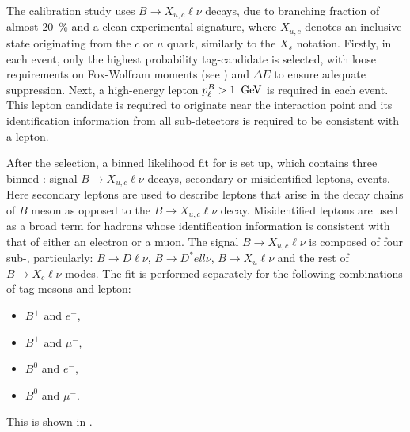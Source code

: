 The calibration study uses $B\rightarrow X_{u,c} \ell \nu$ decays, due to branching fraction of almost 20~\% and a clean experimental signature, 
where $X_{u,c}$ denotes an inclusive state originating from the $c$ or $u$ quark, similarly to the $X_s$ notation.
Firstly, in each event, only the highest \FEI probability tag-\B candidate is selected, with loose requirements on Fox-Wolfram moments (see ) and $\Delta E$ to ensure adequate \epem\ra\qqbar suppression.
Next, a high-energy lepton $p_{\ell}^B>1~\mathrm{\,Ge\kern -0.1em V}$ is required in each event.
This lepton candidate is required to originate near the interaction point and its identification information from all sub-detectors is required to be consistent with a lepton.

After the selection, a binned likelihood fit for \Mbc is set up, which contains three binned : signal $B\rightarrow X_{u,c}\ell\nu$ decays, 
secondary or misidentified leptons, \epem\ra\qqbar events. Here secondary leptons are used to describe leptons that arise in the decay chains of $B$ meson as opposed to the $B\rightarrow X_{u,c}\ell\nu$ decay.
Misidentified leptons are used as a broad term for hadrons whose identification information is consistent with that of either an electron or a muon.
The signal $B\rightarrow X_{u,c}\ell\nu$ \PDF is composed of four sub-, particularly: $B\rightarrow D\ell\nu$, $B\rightarrow D^*ell\nu$, $B\rightarrow X_u\ell\nu$ and the rest of  $B\rightarrow X_c\ell\nu$ modes.
The fit is performed separately for the following combinations of tag-\B mesons and lepton:
\begin{itemize}
    \item $B^+$ and $e^-$,
    \item $B^+$ and $\mu^-$,
    \item $B^0$ and $e^-$,
    \item $B^0$ and $\mu^-$.
\end{itemize}
This is shown in .
